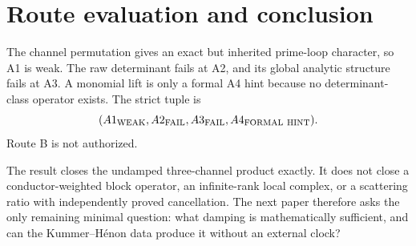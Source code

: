 \documentclass[11pt]{article}
\theoremstyle{remark}\newtheorem{remark}[theorem]{Remark}
\begin{document}
\section{Route evaluation and conclusion}
The channel permutation gives an exact but inherited prime-loop character,
so A1 is weak.  The raw determinant fails at A2, and its global analytic
structure fails at A3.  A monomial lift is only a formal A4 hint because no
determinant-class operator exists.  The strict tuple is
\[
(A1_{\rm WEAK},A2_{\rm FAIL},A3_{\rm FAIL},A4_{\rm FORMAL\ HINT}).
\]
Route B is not authorized.

The result closes the undamped three-channel product exactly.  It does not
close a conductor-weighted block operator, an infinite-rank local complex,
or a scattering ratio with independently proved cancellation.  The next
paper therefore asks the only remaining minimal question: what damping is
mathematically sufficient, and can the Kummer--H\'enon data produce it
without an external clock?


\end{document}
